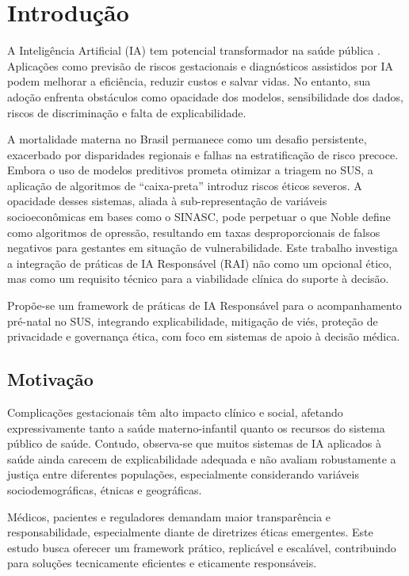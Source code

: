\documentclass[12pt]{article}
\begin{document}
\section{Introdução}

A Inteligência Artificial (IA) tem potencial transformador na saúde pública \cite{Shneiderman2021, Cabitza2022}. Aplicações como previsão de riscos gestacionais \cite{Advancing2025, MachineLearning2022} e diagnósticos assistidos por IA podem melhorar a eficiência, reduzir custos e salvar vidas. No entanto, sua adoção enfrenta obstáculos como opacidade dos modelos, sensibilidade dos dados, riscos de discriminação e falta de explicabilidade.

A mortalidade materna no Brasil permanece como um desafio persistente, exacerbado por disparidades regionais e falhas na estratificação de risco precoce. Embora o uso de modelos preditivos prometa otimizar a triagem no SUS, a aplicação de algoritmos de “caixa-preta” introduz riscos éticos severos. A opacidade desses sistemas, aliada à sub-representação de variáveis socioeconômicas em bases como o SINASC, pode perpetuar o que Noble \cite{Noble2018} define como algoritmos de opressão, resultando em taxas desproporcionais de falsos negativos para gestantes em situação de vulnerabilidade. Este trabalho investiga a integração de práticas de IA Responsável (RAI) não como um opcional ético, mas como um requisito técnico para a viabilidade clínica do suporte à decisão.

Propõe-se um framework de práticas de IA Responsável para o acompanhamento pré-natal no SUS, integrando explicabilidade, mitigação de viés, proteção de privacidade e governança ética, com foco em sistemas de apoio à decisão médica.

\subsection{Motivação}
Complicações gestacionais têm alto impacto clínico e social, afetando expressivamente tanto a saúde materno-infantil quanto os recursos do sistema público de saúde. Contudo, observa-se que muitos sistemas de IA aplicados à saúde ainda carecem de explicabilidade adequada e não avaliam robustamente a justiça entre diferentes populações, especialmente considerando variáveis sociodemográficas, étnicas e geográficas.

Médicos, pacientes e reguladores demandam maior transparência e responsabilidade, especialmente diante de diretrizes éticas emergentes. Este estudo busca oferecer um framework prático, replicável e escalável, contribuindo para soluções tecnicamente eficientes e eticamente responsáveis.
\end{document}
